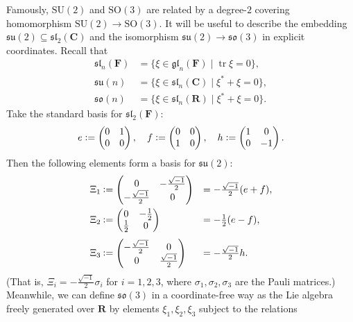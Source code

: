 \documentclass[a4paper,10pt,leqno]{article}
\numberwithin{equation}{section}
\theoremstyle{plain}
\theoremstyle{definition}
\theoremstyle{remark}
\newcommand{\bb}{\mathbf}
\newcommand{\fr}{\mathfrak}
\DeclareMathOperator{\tr}{tr}
\newcommand{\SU}{\mathrm{SU}}
\newcommand{\SO}{\mathrm{SO}}
\newcommand{\mat}[1]{\begin{matrix}#1\end{matrix}}
\newcommand{\pmat}[1]{\left(\mat{#1}\right)}
\begin{document}
Famously, $\SU(2)$ and $\SO(3)$ are related by a degree-$2$ covering homomorphism $\SU(2) \to \SO(3)$.
It will be useful to describe the embedding $\fr{su}(2) \subseteq \fr{sl}_2(\bb{C})$ and the isomorphism $\fr{su}(2) \to \fr{so}(3)$ in explicit coordinates.
Recall that
\begin{align}
\fr{sl}_n(\bb{F}) &= \{\xi \in \fr{gl}_n(\bb{F}) \mid \tr \xi = 0\},\\
\fr{su}(n) &= \{\xi \in \fr{sl}_n(\bb{C}) \mid \xi^\ast + \xi = 0\},\\
\fr{so}(n)& = \{\xi \in \fr{sl}_n(\bb{R}) \mid \xi^\ast + \xi = 0\}.
\end{align}
Take the standard basis for $\fr{sl}_2(\bb{F})$:
\begin{align}
	e \vcentcolon= \pmat{0&1\\ 0&0},\quad 
	f \vcentcolon= \pmat{0&0\\ 1&0},\quad 
	h \vcentcolon= \pmat{1&0\\ 0&-1}.
\end{align}
Then the following elements form a basis for $\fr{su}(2)$:
\begin{align}
\begin{array}{r@{\:}ll}
\Xi_1 &\vcentcolon= \pmat{0&-\frac{\sqrt{-1}}{2}\\ -\frac{\sqrt{-1}}{2}&0}
		&= -\tfrac{\sqrt{-1}}{2}(e + f),\\[3ex]
\Xi_2 &\vcentcolon= \pmat{0&-\frac{1}{2}\\ \frac{1}{2}&0}
		&= -\tfrac{1}{2}(e - f),\\[3ex]
\Xi_3 &\vcentcolon= \pmat{-\frac{\sqrt{-1}}{2}&0\\ 0&\frac{\sqrt{-1}}{2}}
		&= -\tfrac{\sqrt{-1}}{2}h.
	\end{array}
\end{align}
(That is, $\Xi_i = -\frac{\sqrt{-1}}{2}\sigma_i$ for $i = 1,2,3$, where $\sigma_1, \sigma_2, \sigma_3$ are the Pauli matrices.)
Meanwhile, we can define $\fr{so}(3)$ in a coordinate-free way as the Lie algebra freely generated over $\bb{R}$ by elements $\xi_1, \xi_2, \xi_3$ subject to the relations
\end{document}
